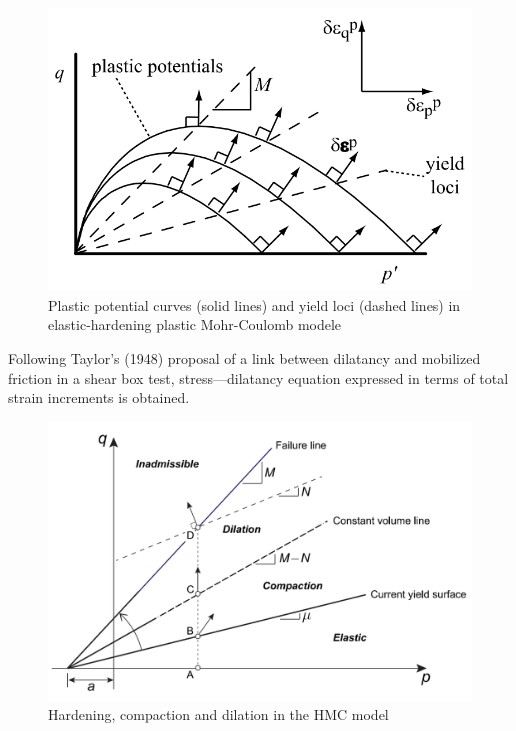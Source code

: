 \documentclass[a4paper, nobind]{templates/ociamthesis}
\begin{document}
\begin{figure}[H]
\includegraphics[width=1\linewidth]{myfigureeeeee/Plastic potential curves (solid lines) and yield loci (dashed lines) in elastic-hardening plastic Mohr-Coulomb model} \caption{Plastic potential curves (solid lines) and yield loci (dashed lines) in elastic-hardening plastic Mohr-Coulomb modele}\label{fig:unnamed-chunk-4}
\end{figure}

Following Taylor's (1948) proposal of a link between dilatancy and mobilized friction in a shear box test, stress---dilatancy equation expressed in terms of total strain increments is obtained.

\begin{figure}[H]
\includegraphics[width=1\linewidth]{myfigureeeeee/Hardening, compaction and dilation in the HMC model} \caption{Hardening, compaction and dilation in the HMC model}\label{fig:unnamed-chunk-5}
\end{figure}
\end{document}
